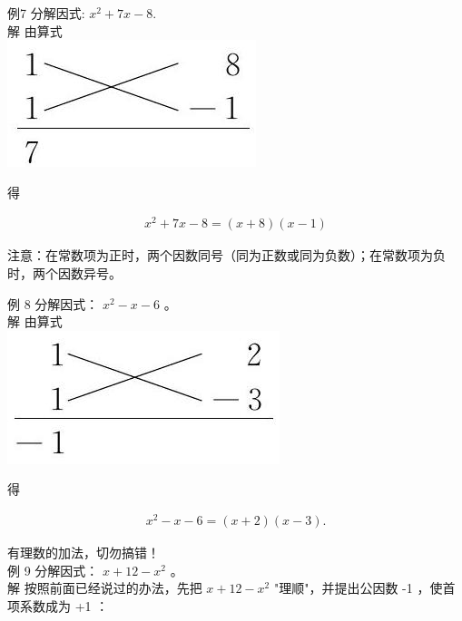 \documentclass[10pt]{article}
\begin{document}
例7 分解因式: $x^{2}+7 x-8$.\\
解 由算式\\
\includegraphics[max width=\textwidth, center]{2024_10_30_bd799899fef40368a068g-036(3)}

得

\begin{align*}
x^{2}+7 x-8=(x+8)(x-1)
\end{align*}

注意：在常数项为正时，两个因数同号（同为正数或同为负数）；在常数项为负时，两个因数异号。

例 8 分解因式： $x^{2}-x-6$ 。\\
解 由算式\\
\includegraphics[max width=\textwidth, center]{2024_10_30_bd799899fef40368a068g-036(2)}

得

\begin{align*}
x^{2}-x-6=(x+2)(x-3) .
\end{align*}

有理数的加法，切勿搞错！\\
例 9 分解因式： $x+12-x^{2}$ 。\\
解 按照前面已经说过的办法，先把 $x+12-x^{2}$ "理顺"，并提出公因数 -1 ，使首项系数成为 +1 ：
\end{document}
